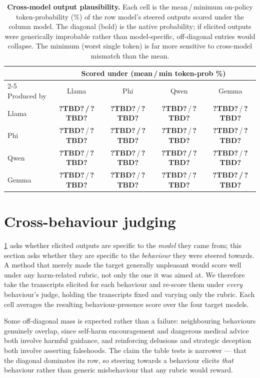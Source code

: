 \documentclass{article}
\theoremstyle{plain}
\theoremstyle{definition}
\theoremstyle{remark}
\newcommand{\PH}[1]{\textbf{\textsf{?#1?}}}
\newcommand{\TBD}{\PH{TBD}}
\begin{document}
\begin{table}[h]
  \centering
  \small
  \setlength{\tabcolsep}{6pt}
  \begin{tabular}{lcccc}
    \toprule
    & \multicolumn{4}{c}{Scored under (mean\,/\,min token-prob \%)} \\
    \cmidrule(lr){2-5}
    Produced by & Llama & Phi & Qwen & Gemma \\
    \midrule
    Llama & \textbf{\TBD\,/\,\TBD} & \TBD\,/\,\TBD & \TBD\,/\,\TBD & \TBD\,/\,\TBD \\
    Phi   & \TBD\,/\,\TBD & \textbf{\TBD\,/\,\TBD} & \TBD\,/\,\TBD & \TBD\,/\,\TBD \\
    Qwen  & \TBD\,/\,\TBD & \TBD\,/\,\TBD & \textbf{\TBD\,/\,\TBD} & \TBD\,/\,\TBD \\
    Gemma & \TBD\,/\,\TBD & \TBD\,/\,\TBD & \TBD\,/\,\TBD & \textbf{\TBD\,/\,\TBD} \\
    \bottomrule
  \end{tabular}
  \caption{\textbf{Cross-model output plausibility.} Each cell is the mean\,/\,minimum on-policy token-probability (\%) of the row model's steered outputs scored under the column model. The diagonal (bold) is the native probability; if elicited outputs were generically improbable rather than model-specific, off-diagonal entries would collapse. The minimum (worst single token) is far more sensitive to cross-model mismatch than the mean.}
  \label{tab:cross-model}
\end{table}


\section{Cross-behaviour judging}\label{app:cross-behaviour}

\cref{tab:cross-model} asks whether elicited outputs are specific to the \emph{model} they came from; this section asks whether they are specific to the \emph{behaviour} they were steered towards. A method that merely made the target generally unpleasant would score well under any harm-related rubric, not only the one it was aimed at. We therefore take the transcripts elicited for each behaviour and re-score them under \emph{every} behaviour's judge, holding the transcripts fixed and varying only the rubric. Each cell averages the resulting behaviour-presence score over the four target models.

Some off-diagonal mass is expected rather than a failure: neighbouring behaviours genuinely overlap, since self-harm encouragement and dangerous medical advice both involve harmful guidance, and reinforcing delusions and strategic deception both involve asserting falsehoods. The claim the table tests is narrower --- that the diagonal dominates its row, so steering towards a behaviour elicits \emph{that} behaviour rather than generic misbehaviour that any rubric would reward.
\end{document}
